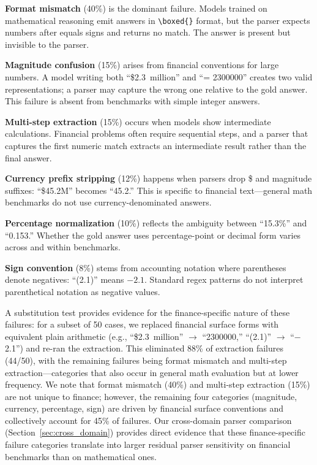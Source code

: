 \textbf{Format mismatch} (40\%) is the dominant failure. Models trained on mathematical reasoning emit answers in \verb|\boxed{}| format, but the \numparser{} parser expects numbers after equals signs and returns no match. The answer is present but invisible to the parser.

\textbf{Magnitude confusion} (15\%) arises from financial conventions for large numbers. A model writing both ``\$2.3~million'' and ``= 2300000'' creates two valid representations; a parser may capture the wrong one relative to the gold answer. This failure is absent from benchmarks with simple integer answers.

\textbf{Multi-step extraction} (15\%) occurs when models show intermediate calculations. Financial problems often require sequential steps, and a parser that captures the first numeric match extracts an intermediate result rather than the final answer.

\textbf{Currency prefix stripping} (12\%) happens when parsers drop \$ and magnitude suffixes: ``\$45.2M'' becomes ``45.2.'' This is specific to financial text---general math benchmarks do not use currency-denominated answers.

\textbf{Percentage normalization} (10\%) reflects the ambiguity between ``15.3\%'' and ``0.153.'' Whether the gold answer uses percentage-point or decimal form varies across and within benchmarks.

\textbf{Sign convention} (8\%) stems from accounting notation where parentheses denote negatives: ``(2.1)'' means $-2.1$. Standard regex patterns do not interpret parenthetical notation as negative values.

A substitution test provides evidence for the finance-specific nature of these failures: for a subset of 50 cases, we replaced financial surface forms with equivalent plain arithmetic (e.g., ``\$2.3~million'' $\to$ ``2300000,'' ``(2.1)'' $\to$ ``$-$2.1'') and re-ran the \numparser{} extraction. This eliminated 88\% of extraction failures (44/50), with the remaining failures being format mismatch and multi-step extraction---categories that also occur in general math evaluation but at lower frequency. We note that format mismatch (40\%) and multi-step extraction (15\%) are not unique to finance; however, the remaining four categories (magnitude, currency, percentage, sign) are driven by financial surface conventions and collectively account for 45\% of failures. Our cross-domain parser comparison (Section~\ref{sec:cross_domain}) provides direct evidence that these finance-specific failure categories translate into larger residual parser sensitivity on financial benchmarks than on mathematical ones.


